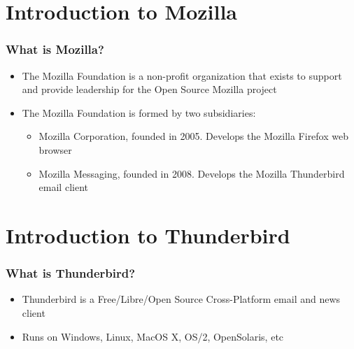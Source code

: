 \documentclass{beamer}
\begin{document}

\section{Introduction to Mozilla}


\begin{frame}
\frametitle{What is Mozilla?}
 \begin{itemize}
 \item The Mozilla Foundation is a non-profit organization that exists to support and provide leadership for the Open Source Mozilla project
 \item The Mozilla Foundation is formed by two subsidiaries:
     \begin{itemize}
     \item Mozilla Corporation, founded in 2005. Develops the Mozilla Firefox web browser
     \item Mozilla Messaging, founded in 2008. Develops the Mozilla Thunderbird email client
     \end{itemize}

 \end{itemize}
\end{frame}


\section{Introduction to Thunderbird}


\begin{frame}
\frametitle{What is Thunderbird?}
 \begin{itemize}
 \item Thunderbird is a Free/Libre/Open Source Cross-Platform email and news client
 \item Runs on Windows, Linux, MacOS X, OS/2, OpenSolaris, etc
 \end{itemize}
\end{frame}


\end{document}
